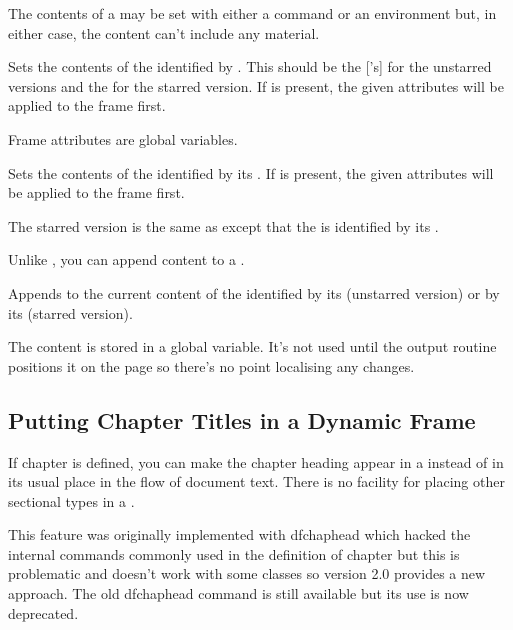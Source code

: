 \documentclass[fontsize=12pt]{scrbook}
\begin{document}
The contents of a  may be set with either a
command or an environment but, in either case, the content can't
include any  material.

Sets the contents of the  identified by
. This should be the ['s]  for the
unstarred versions and the  for the starred version.
If  is present, the given attributes will be
applied to the frame first.

\begin{information}
Frame attributes are global variables.
\end{information}

Sets the contents of the  identified by its
. If  is present, the given attributes will
be applied to the frame first.

The starred version is the same as  except that
the  is identified by its .

Unlike , you can append content to a
.

Appends  to the current content of the
 identified by its  (unstarred version)
or by its  (starred version).

\begin{information}
The  content is stored in a global variable.  
It's not used until the output routine positions it on the page 
so there's no point localising any changes.
\end{information}

\subsection{Putting Chapter Titles in a Dynamic Frame}
\label{sec:dfchaphead}

If \gls{chapter} is defined, you can make the chapter heading appear
in a  instead of in its usual place in the flow of
document text. There is no facility for placing other sectional types in a
.

This feature was originally implemented with \gls{dfchaphead}
which hacked the internal commands commonly used in the definition
of \gls{chapter} but this is problematic and doesn't work with some
classes so version 2.0 provides a new approach. The old
\gls{dfchaphead} command is still available but its use is now
deprecated.
\end{document}
